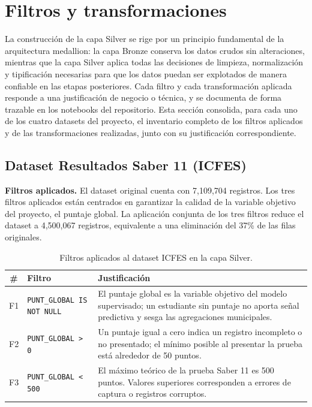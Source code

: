 \section{Filtros y transformaciones}
La construcción de la capa Silver se rige por un principio fundamental de la arquitectura medallion: la capa Bronze conserva los datos crudos sin alteraciones, mientras que la capa Silver aplica todas las decisiones de limpieza, normalización y tipificación necesarias para que los datos puedan ser explotados de manera confiable en las etapas posteriores. Cada filtro y cada transformación aplicada responde a una justificación de negocio o técnica, y se documenta de forma trazable en los notebooks del repositorio. Esta sección consolida, para cada uno de los cuatro datasets del proyecto, el inventario completo de los filtros aplicados y de las transformaciones realizadas, junto con su justificación correspondiente.

\subsection{Dataset Resultados Saber 11 (ICFES)}

\textbf{Filtros aplicados.} El dataset original cuenta con 7,109,704 registros. Los tres filtros aplicados están centrados en garantizar la calidad de la variable objetivo del proyecto, el puntaje global. La aplicación conjunta de los tres filtros reduce el dataset a 4,500,067 registros, equivalente a una eliminación del 37\% de las filas originales.

\begin{table}[H]
\centering
\caption{Filtros aplicados al dataset ICFES en la capa Silver.}
\begin{tabularx}{\textwidth}{c l X}
\toprule
\textbf{\#} & \textbf{Filtro} & \textbf{Justificación} \\
\midrule
F1 & \texttt{PUNT\_GLOBAL IS NOT NULL} & El puntaje global es la variable objetivo del modelo supervisado; un estudiante sin puntaje no aporta señal predictiva y sesga las agregaciones municipales. \\
F2 & \texttt{PUNT\_GLOBAL > 0} & Un puntaje igual a cero indica un registro incompleto o no presentado; el mínimo posible al presentar la prueba está alrededor de 50 puntos. \\
F3 & \texttt{PUNT\_GLOBAL < 500} & El máximo teórico de la prueba Saber 11 es 500 puntos. Valores superiores corresponden a errores de captura o registros corruptos. \\
\bottomrule
\end{tabularx}
\end{table}

